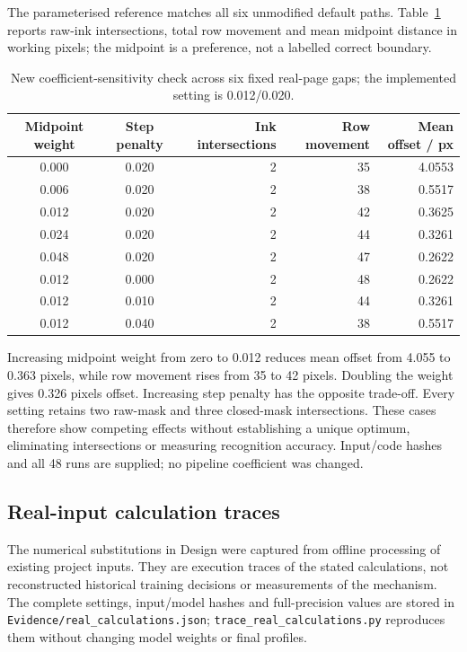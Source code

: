 The parameterised reference matches all six unmodified default paths. Table~\ref{tab:app-seam-sweep} reports raw-ink intersections, total row movement and mean midpoint distance in working pixels; the midpoint is a preference, not a labelled correct boundary.

\begin{table}[!htbp]\centering\small
\begin{tabular}{|c|c|r|r|r|}
\hline Midpoint weight&Step penalty&Ink intersections&Row movement&Mean offset / px\\\hline
0.000&0.020&2&35&4.0553\\\hline
0.006&0.020&2&38&0.5517\\\hline
0.012&0.020&2&42&0.3625\\\hline
0.024&0.020&2&44&0.3261\\\hline
0.048&0.020&2&47&0.2622\\\hline
0.012&0.000&2&48&0.2622\\\hline
0.012&0.010&2&44&0.3261\\\hline
0.012&0.040&2&38&0.5517\\\hline
\end{tabular}
\caption{New coefficient-sensitivity check across six fixed real-page gaps; the implemented setting is 0.012/0.020.}
\label{tab:app-seam-sweep}
\end{table}

Increasing midpoint weight from zero to 0.012 reduces mean offset from 4.055 to 0.363 pixels, while row movement rises from 35 to 42 pixels. Doubling the weight gives 0.326 pixels offset. Increasing step penalty has the opposite trade-off. Every setting retains two raw-mask and three closed-mask intersections. These cases therefore show competing effects without establishing a unique optimum, eliminating intersections or measuring recognition accuracy. Input/code hashes and all 48 runs are supplied; no pipeline coefficient was changed.
\FloatBarrier


\subsection{Real-input calculation traces}\label{app:des-real-calculations}
The numerical substitutions in Design were captured from offline processing of existing project inputs. They are execution traces of the stated calculations, not reconstructed historical training decisions or measurements of the mechanism. The complete settings, input/model hashes and full-precision values are stored in \texttt{Evidence/real\_calculations.json}; \texttt{trace\_real\_calculations.py} reproduces them without changing model weights or final profiles.

